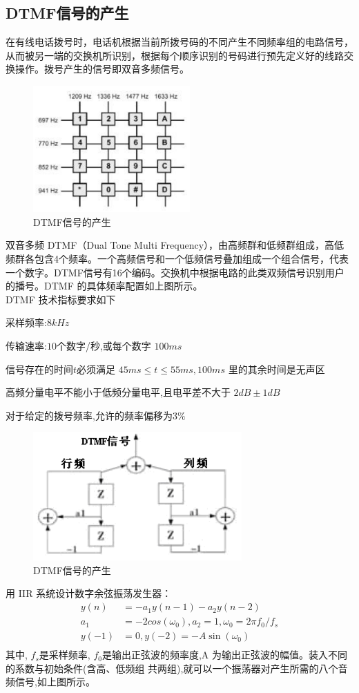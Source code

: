 \documentclass{article}
\begin{document}
\begin{CJK}{UTF8}{gbsn}
\subsection{DTMF信号的产生}
在有线电话拨号时，电话机根据当前所拨号码的不同产生不同频率组的电路信号，从而被另一端的交换机所识别，根据每个顺序识别的号码进行预先定义好的线路交换操作。拨号产生的信号即双音多频信号。
\begin{figure}[!h]
\centering
\includegraphics[width=6cm]{dtmf.png}
\caption{DTMF信号的产生}
\end{figure}
双音多频 DTMF（Dual Tone Multi Frequency），由高频群和低频群组成，高低频群各包含4个频率。一个高频信号和一个低频信号叠加组成一个组合信号，代表一个数字。DTMF信号有16个编码。交换机中根据电路的此类双频信号识别用户的播号。DTMF 的具体频率配置如上图所示。\\
DTMF 技术指标要求如下
\begin{compactenum}
\item 采样频率:$8kHz$
\item 传输速率:$10$个数字/秒,或每个数字 $100ms$
\item 信号存在的时间$t$必须满足 $45ms\leq t\leq 55ms,100ms$ 里的其余时间是无声区
\item 高频分量电平不能小于低频分量电平,且电平差不大于 $2dB±1dB$
\item 对于给定的拨号频率,允许的频率偏移为$3\%$
\end{compactenum}
\begin{figure}[h!]
\centering
\includegraphics[width=8cm]{DTMFG.png}
\caption{DTMF信号的产生}
\end{figure}
用 IIR 系统设计数字余弦振荡发生器：
\begin{align*}
y(n)&=-a_1y(n-1)-a_2y(n-2)\\
a_1&=-2cos(\omega_0),a_2=1,\omega_0=2\pi f_0/f_s\\
y(-1)&=0,y(-2)=-A\sin(\omega_0)\\
\end{align*}
其中, $f_s$是采样频率, $f_0$是输出正弦波的频率度,A 为输出正弦波的幅值。装入不同的系数与初始条件(含高、低频组
共两组),就可以一个振荡器对产生所需的八个音频信号,如上图所示。

\end{CJK}
\end{document}
